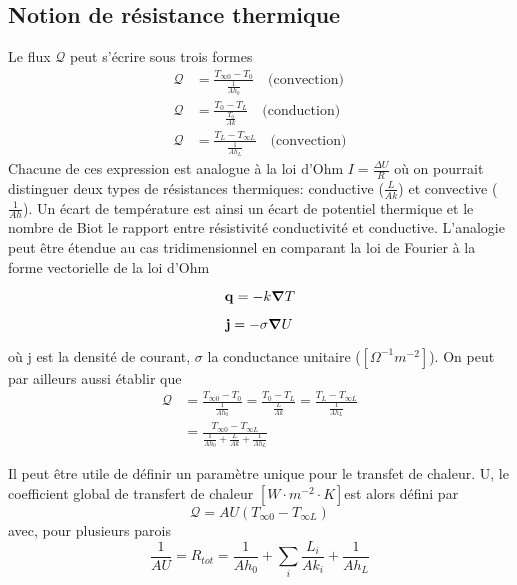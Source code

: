 \documentclass[a4paper,11pt]{report}
\newcommand{\recip}[1]{\frac{1}{#1}}
\begin{document}
    \subsection{Notion de résistance thermique}
      Le flux $\mathcal{Q}$ peut s'écrire sous trois formes
      \begin{equation}
        \begin{aligned}
          \mathcal{Q} &= \frac{T_{\infty 0} - T_0}{\recip{Ah_0}} \quad \textrm{(convection)}\\
          \mathcal{Q} &= \frac{T_0 - T_L}{\frac{T_0}{Ak}} \quad \textrm{(conduction)}\\
          \mathcal{Q} &= \frac{T_L - T_{\infty L}}{\recip{Ah_L}} \quad \textrm{(convection)}
        \end{aligned}
      \end{equation}
      Chacune de ces expression est analogue à la loi d'Ohm $I = \frac{\Delta U}{R}$ où on pourrait distinguer deux types de résistances thermiques: conductive ($\frac{L}{Ak}$) et convective ($\recip{Ah}$). Un écart de température est ainsi un écart de potentiel thermique et le nombre de Biot le rapport entre résistivité conductivité et conductive. L'analogie peut être étendue au cas tridimensionnel en comparant la loi de Fourier à la forme vectorielle de la loi d'Ohm
      \begin{multicols}{2}
        \begin{equation}
          \vb{q} = - k  \grad T \nonumber
        \end{equation}

        \begin{equation}
          \vb{j} = - \sigma \grad U
        \end{equation}
      \end{multicols}
      où j est la densité de courant, $\sigma$ la conductance unitaire ($[\si{\Omega^{-1} m^{-2}}]$). On peut par ailleurs aussi établir que
      \begin{equation}
        \begin{aligned}
          \mathcal{Q} &= \frac{T_{\infty 0} - T_0}{\recip{Ah_0}} = \frac{T_{0} - T_L}{\frac{L}{Ak}} = \frac{T_L - T_{\infty L}}{\recip{Ah_L}}\\
          &= \frac{T_{\infty 0} - T_{\infty L}}{\recip{Ah_0} + \frac{L}{Ak} + \recip{Ah_L}}
        \end{aligned}
      \end{equation}

      Il peut être utile de définir un paramètre unique pour le transfet de chaleur. U, le coefficient global de transfert de chaleur $[\si{W \cdot m^{-2} \cdot K}]$est alors défini par
      \begin{equation}
        \mathcal{Q} = AU(T_{\infty 0} - T_{\infty L})
      \end{equation}
      avec, pour plusieurs parois
      \begin{equation}
        \recip{AU} = R_{tot} = \recip{Ah_0} + \sum_i \frac{L_i}{Ak_i} + \recip{Ah_L}
      \end{equation}
\end{document}

